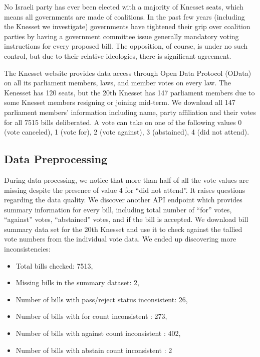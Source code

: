 No Israeli party has ever been elected with a majority of Knesset seats,
which means all governments are made of coalitions.
In the past few years (including the Knesset we investigate)
governments have tightened their grip over coalition parties by having a government committee issue generally mandatory
voting instructions for every proposed bill.
The opposition, of course, is under no such control,
but due to their relative ideologies, there is significant agreement.

The Knesset website provides data access through Open Data Protocol (OData)
on all its parliament members, laws, and member votes on every law.
The Kenesset has 120 seats, but the 20th Knesset has 147 parliament members
due to some Knesset members resigning or joining mid-term.
We download all 147 parliament members' information including name,
party affiliation and their votes for all 7515 bills deliberated.
A vote can take on one of the following values
0 (vote canceled), 1 (vote for), 2 (vote against),
3 (abstained), 4 (did not attend).

\subsection{Data Preprocessing}
\label{subsec:data_preprocessing}

During data processing, we notice that more than half of all the vote values
are missing despite the presence of value 4 for ``did not attend''.
It raises questions regarding the data quality.
We discover another API endpoint which provides summary information for
every bill, including total number of ``for'' votes, ``against'' votes,
``abstained'' votes, and if the bill is accepted.
We download bill summary data set for the 20th Knesset and use it
to check against the tallied vote numbers from the individual vote data.
We ended up discovering more inconsistencies:

\begin{itemize}
  \item Total bills checked: 7513,
  \item Missing bills in the summary dataset: 2,
  \item Number of bills with pass/reject status inconsistent: 26,
  \item Number of bills with for count inconsistent : 273,
  \item Number of bills with against count inconsistent : 402,
  \item Number of bills with abstain count inconsistent : 2
\end{itemize}

